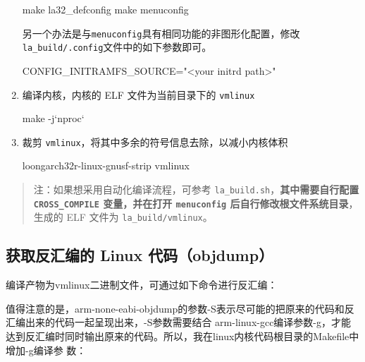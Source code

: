 \begin{enumerate}
\begin{CodeBlock}[language=BookShell]
make la32_defconfig
make menuconfig
\end{CodeBlock}

  另一个办法是与\texttt{menuconfig}具有相同功能的非图形化配置，修改\texttt{la\_build/.config}文件中的如下参数即可。

\begin{CodeBlock}[language=BookConfig]
CONFIG_INITRAMFS_SOURCE="<your initrd path>"
\end{CodeBlock}
\item
  编译内核，内核的 ELF 文件为当前目录下的 \texttt{vmlinux}

\begin{CodeBlock}[language=BookShell]
make -j`nproc`
\end{CodeBlock}
\item
  裁剪 \texttt{vmlinux}，将其中多余的符号信息去除，以减小内核体积

\begin{CodeBlock}[language=BookShell]
loongarch32r-linux-gnusf-strip vmlinux
\end{CodeBlock}
\end{enumerate}

\begin{quote}
注：如果想采用自动化编译流程，可参考 \texttt{la\_build.sh}，\textbf{其中需要自行配置 \texttt{CROSS\_COMPILE} 变量，并在打开 \texttt{menuconfig} 后自行修改根文件系统目录}，生成的 ELF 文件为 \texttt{la\_build/vmlinux}。
\end{quote}

\subsection{获取反汇编的 Linux 代码（objdump）}\label{sec:02-software-preparation-019}

编译产物为vmlinux二进制文件，可通过如下命令进行反汇编：


值得注意的是，arm-none-eabi-objdump的参数-S表示尽可能的把原来的代码和反汇编出来的代码一起呈现出来，-S参数需要结合 arm-linux-gcc编译参数-g，才能达到反汇编时同时输出原来的代码。所以，我在linux内核代码根目录的Makefile中增加-g编译参 数：

